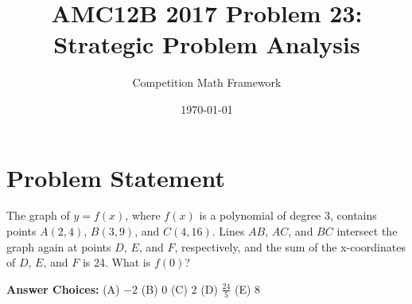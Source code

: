 \documentclass[]{article}
\begin{document}
\title{AMC12B 2017 Problem 23: Strategic Problem Analysis}
\author{Competition Math Framework}
\date{\today}
\maketitle

\section*{Problem Statement}

The graph of $y = f(x)$, where $f(x)$ is a polynomial of degree 3, contains points $A(2, 4)$, $B(3, 9)$, and $C(4, 16)$. Lines $AB$, $AC$, and $BC$ intersect the graph again at points $D$, $E$, and $F$, respectively, and the sum of the x-coordinates of $D$, $E$, and $F$ is 24. What is $f(0)$?

\textbf{Answer Choices:} (A) $-2$ \quad (B) $0$ \quad (C) $2$ \quad (D) $\frac{24}{5}$ \quad (E) $8$
\end{document}
